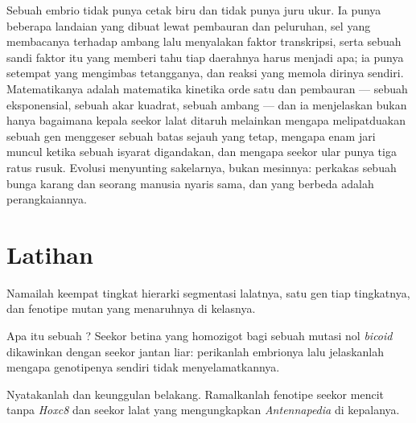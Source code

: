 \begin{remark}\label{rem:b3:developmental-genetics:remark}
Sebuah embrio tidak punya cetak biru dan tidak punya juru ukur. Ia punya beberapa landaian
yang dibuat lewat pembauran dan peluruhan, sel yang membacanya terhadap ambang
lalu menyalakan faktor transkripsi, serta sebuah sandi faktor itu yang
memberi tahu tiap daerahnya harus menjadi apa; ia punya  setempat yang mengimbas
tetangganya, dan reaksi yang memola dirinya sendiri. Matematikanya
adalah matematika kinetika orde satu dan pembauran --- sebuah
eksponensial, sebuah akar kuadrat, sebuah ambang --- dan ia menjelaskan bukan hanya
bagaimana kepala seekor lalat ditaruh melainkan mengapa melipatduakan sebuah gen menggeser sebuah batas
sejauh yang tetap, mengapa enam jari muncul ketika sebuah isyarat
digandakan, dan mengapa seekor ular punya tiga ratus rusuk. Evolusi menyunting
sakelarnya, bukan mesinnya: perkakas sebuah bunga karang dan seorang manusia
nyaris sama, dan yang berbeda adalah perangkaiannya.
\end{remark}

\section{Latihan}

\begin{exercise}[$\star$]\label{exo:b3:developmental-genetics:1}
Namailah keempat tingkat hierarki segmentasi lalatnya, satu gen tiap
tingkatnya, dan fenotipe mutan yang menaruhnya di kelasnya.
\end{exercise}

\begin{exercise}[$\star$]\label{exo:b3:developmental-genetics:2}
Apa itu sebuah ? Seekor betina yang homozigot bagi sebuah mutasi
nol \emph{bicoid} dikawinkan dengan seekor jantan liar: perikanlah embrionya lalu
jelaskanlah mengapa genotipenya sendiri tidak menyelamatkannya.
\end{exercise}

\begin{exercise}[$\star$]\label{exo:b3:developmental-genetics:3}
Nyatakanlah  dan keunggulan belakang. Ramalkanlah fenotipe seekor
mencit tanpa \emph{Hoxc8} dan seekor lalat yang mengungkapkan \emph{Antennapedia}
di kepalanya.
\end{exercise}

